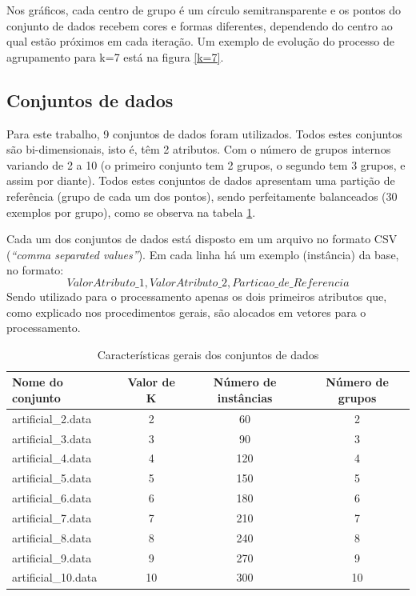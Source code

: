 \documentclass[12pt, a4paper]{article}
\begin{document}
Nos gráficos, cada centro de grupo é um círculo semitransparente e os pontos do conjunto de dados recebem cores e formas diferentes, dependendo do centro ao qual estão próximos em cada iteração. Um exemplo de evolução do processo de agrupamento para k=7 está na figura \ref{k=7}.

\subsection{Conjuntos de dados}
\label{dados}
Para este trabalho, 9 conjuntos de dados foram utilizados. Todos estes conjuntos são bi-dimensionais, isto é, têm 2 atributos. Com o número de grupos internos variando de 2 a 10 (o primeiro conjunto tem 2 grupos, o segundo tem 3 grupos, e assim por diante). Todos estes conjuntos de dados apresentam uma partição de referência (grupo de cada um dos pontos), sendo perfeitamente balanceados (30 exemplos por grupo), como se observa na tabela \ref{conjDados}.

Cada um dos conjuntos de dados está disposto em um arquivo no formato CSV (\emph{``comma separated values''}). Em cada linha há um exemplo (instância) da base, no formato: $$Valor Atributo\_1, Valor Atributo\_2, Particao\_de\_Referencia$$ Sendo utilizado para o processamento apenas os dois primeiros atributos que, como explicado nos procedimentos gerais, são alocados em vetores para o processamento.

\begin{table}[!ht]
\centering
\caption{Características gerais dos conjuntos de dados}
\label{conjDados}
	\begin{tabular}{|l|c|c|c|}
	\hline
	Nome do conjunto & Valor de K & Número de instâncias & Número de grupos \\
	\hline
		artificial\_2.data & 2 & 60 & 2 \\
	\hline
		artificial\_3.data & 3 & 90 & 3 \\
	\hline
		artificial\_4.data & 4 & 120 & 4 \\
	\hline
		artificial\_5.data & 5 & 150 & 5 \\
	\hline
		artificial\_6.data & 6 & 180 & 6 \\
	\hline
		artificial\_7.data & 7 & 210 & 7 \\
	\hline
		artificial\_8.data & 8 & 240 & 8 \\
	\hline
		artificial\_9.data & 9 & 270 & 9 \\
	\hline
		artificial\_10.data & 10 & 300 & 10 \\
	\hline
	\end{tabular}
\end{table}
\end{document}
